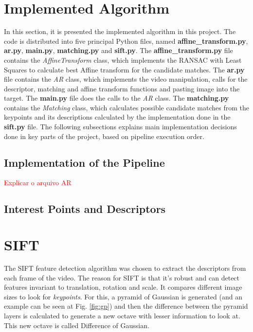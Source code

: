 \documentclass[]{IEEEtran}
\newcommand\todolist[1]{\textcolor{red}{#1}}
\begin{document}
\section{Implemented Algorithm}
In this section, it is presented the implemented algorithm in this project. The code is distributed into five principal Python files, named \textbf{affine\_transform.py}, \textbf{ar.py}, \textbf{main.py}, \textbf{matching.py} and \textbf{sift.py}. The \textbf{affine\_transform.py} file contains the \textit{AffineTransform} class, which implements the RANSAC with Least Squares to calculate best Affine transform for the candidate matches. The \textbf{ar.py} file contains the \textit{AR} class, which implements the video manipulation, calls for the descriptor, matching and affine transform functions and pasting image into the target. The \textbf{main.py} file does the calls to the \textit{AR} class. The \textbf{matching.py} contains the \textit{Matching} class, which calculates possible candidate matches from the keypoints and its descriptions calculated by the implementation done in the \textbf{sift.py} file. The following subsections explains main implementation decisions done in key parts of the project, based on pipeline execution order.


\subsection{Implementation of the Pipeline}
\todolist{Explicar o arquivo AR}


\subsection{Interest Points and Descriptors}
\section{SIFT}
 The SIFT feature detection algorithm was chosen to extract the descriptors from each frame of the video. The reason for SIFT is that it's robust and can detect features invariant to translation, rotation and scale. It compares different image sizes to look for \textit{keypoints}. For this, a pyramid of Gaussian is generated (and an example can be seen at Fig. \ref{fig:gp}) and then the difference between the pyramid layers is calculated to generate a new octave with lesser information to look at. This new octave is called Difference of Gaussian.
 
\end{document}
